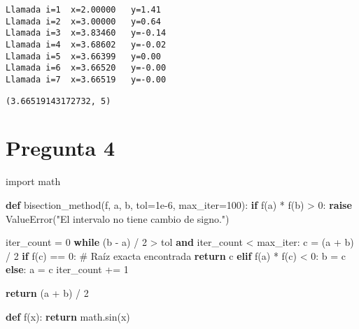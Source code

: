 \documentclass[
  letterpaper,
  DIV=11,
  numbers=noendperiod]{scrartcl}
\newenvironment{Shaded}{\begin{snugshade}}{\end{snugshade}}
\newcommand{\CommentTok}[1]{\textcolor[rgb]{0.37,0.37,0.37}{#1}}
\newcommand{\ControlFlowTok}[1]{\textcolor[rgb]{0.00,0.23,0.31}{\textbf{#1}}}
\newcommand{\DecValTok}[1]{\textcolor[rgb]{0.68,0.00,0.00}{#1}}
\newcommand{\FloatTok}[1]{\textcolor[rgb]{0.68,0.00,0.00}{#1}}
\newcommand{\ImportTok}[1]{\textcolor[rgb]{0.00,0.46,0.62}{#1}}
\newcommand{\KeywordTok}[1]{\textcolor[rgb]{0.00,0.23,0.31}{\textbf{#1}}}
\newcommand{\NormalTok}[1]{\textcolor[rgb]{0.00,0.23,0.31}{#1}}
\newcommand{\OperatorTok}[1]{\textcolor[rgb]{0.37,0.37,0.37}{#1}}
\newcommand{\PreprocessorTok}[1]{\textcolor[rgb]{0.68,0.00,0.00}{#1}}
\newcommand{\StringTok}[1]{\textcolor[rgb]{0.13,0.47,0.30}{#1}}
\begin{document}
\begin{verbatim}
Llamada i=1  x=2.00000   y=1.41
Llamada i=2  x=3.00000   y=0.64
Llamada i=3  x=3.83460   y=-0.14
Llamada i=4  x=3.68602   y=-0.02
Llamada i=5  x=3.66399   y=0.00
Llamada i=6  x=3.66520   y=-0.00
Llamada i=7  x=3.66519   y=-0.00
\end{verbatim}

\begin{verbatim}
(3.66519143172732, 5)
\end{verbatim}

\section{Pregunta 4}\label{pregunta-4}

\begin{Shaded}
\begin{Highlighting}[]
\ImportTok{import}\NormalTok{ math}

\KeywordTok{def}\NormalTok{ bisection\_method(f, a, b, tol}\OperatorTok{=}\FloatTok{1e{-}6}\NormalTok{, max\_iter}\OperatorTok{=}\DecValTok{100}\NormalTok{):}
    \ControlFlowTok{if}\NormalTok{ f(a) }\OperatorTok{*}\NormalTok{ f(b) }\OperatorTok{\textgreater{}} \DecValTok{0}\NormalTok{:}
        \ControlFlowTok{raise} \PreprocessorTok{ValueError}\NormalTok{(}\StringTok{"El intervalo no tiene cambio de signo."}\NormalTok{)}

\NormalTok{    iter\_count }\OperatorTok{=} \DecValTok{0}
    \ControlFlowTok{while}\NormalTok{ (b }\OperatorTok{{-}}\NormalTok{ a) }\OperatorTok{/} \DecValTok{2} \OperatorTok{\textgreater{}}\NormalTok{ tol }\KeywordTok{and}\NormalTok{ iter\_count }\OperatorTok{\textless{}}\NormalTok{ max\_iter:}
\NormalTok{        c }\OperatorTok{=}\NormalTok{ (a }\OperatorTok{+}\NormalTok{ b) }\OperatorTok{/} \DecValTok{2}
        \ControlFlowTok{if}\NormalTok{ f(c) }\OperatorTok{==} \DecValTok{0}\NormalTok{:  }\CommentTok{\# Raíz exacta encontrada}
            \ControlFlowTok{return}\NormalTok{ c}
        \ControlFlowTok{elif}\NormalTok{ f(a) }\OperatorTok{*}\NormalTok{ f(c) }\OperatorTok{\textless{}} \DecValTok{0}\NormalTok{:}
\NormalTok{            b }\OperatorTok{=}\NormalTok{ c}
        \ControlFlowTok{else}\NormalTok{:}
\NormalTok{            a }\OperatorTok{=}\NormalTok{ c}
\NormalTok{        iter\_count }\OperatorTok{+=} \DecValTok{1}

    \ControlFlowTok{return}\NormalTok{ (a }\OperatorTok{+}\NormalTok{ b) }\OperatorTok{/} \DecValTok{2}

\KeywordTok{def}\NormalTok{ f(x):}
    \ControlFlowTok{return}\NormalTok{ math.sin(x)}


\end{Highlighting}
\end{Shaded}
\end{document}
